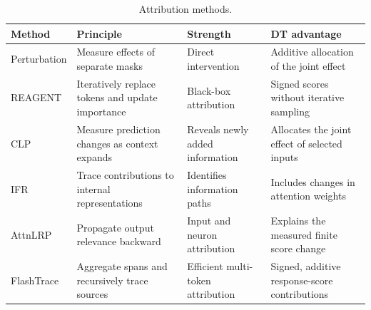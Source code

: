 \begin{table}[!htb]
\centering\small
\caption{Attribution methods.}
\label{tab:baseline-methods}
\setlength{\tabcolsep}{4pt}
\renewcommand{\arraystretch}{1.15}
\begin{tabular}{@{}>{\raggedright\arraybackslash}p{.17\linewidth}>{\raggedright\arraybackslash}p{.27\linewidth}>{\raggedright\arraybackslash}p{.20\linewidth}>{\raggedright\arraybackslash}p{}@{}}
\toprule
Method & Principle & Strength & DT advantage \\
\midrule
Perturbation\newline\citep{pan2026flashtrace} & Measure effects of separate masks & Direct intervention & Additive allocation of the joint effect \\
\addlinespace[4pt]
REAGENT\newline\citep{zhao2024reagent} & Iteratively replace tokens and update importance & Black-box attribution & Signed scores without iterative sampling \\
\addlinespace[4pt]
CLP\newline\citep{cifka2023context} & Measure prediction changes as context expands & Reveals newly added information & Allocates the joint effect of selected inputs \\
\addlinespace[4pt]
IFR\newline\citep{ferrando2024information} & Trace contributions to internal representations & Identifies information paths & Includes changes in attention weights \\
\addlinespace[4pt]
AttnLRP\newline\citep{achtibat2024attnlrp} & Propagate output relevance backward & Input and neuron attribution & Explains the measured finite score change \\
\addlinespace[4pt]
FlashTrace\newline\citep{pan2026flashtrace} & Aggregate spans and recursively trace sources & Efficient multi-token attribution & Signed, additive response-score contributions \\
\bottomrule
\end{tabular}
\end{table}

